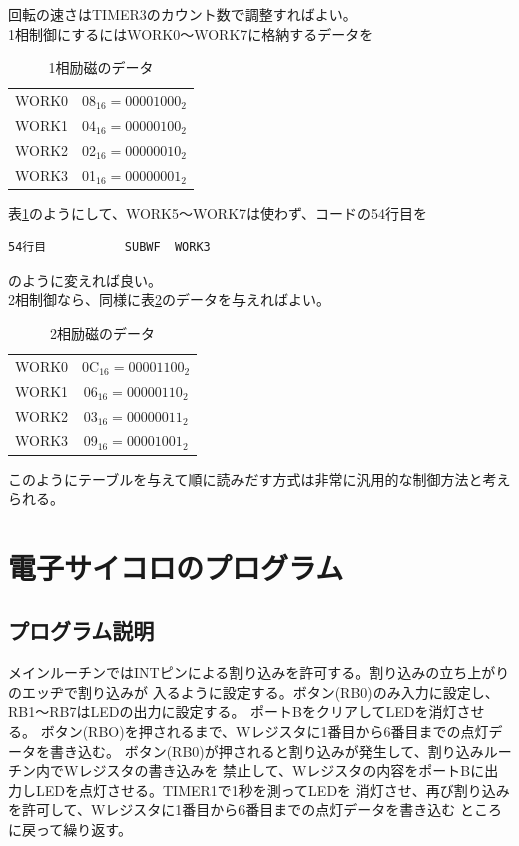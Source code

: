 \documentclass[a4paper,12pt]{ujarticle}
\begin{document}
     回転の速さはTIMER3のカウント数で調整すればよい。
     \\

     1相制御にするにはWORK0〜WORK7に格納するデータを
     \begin{table}[htbp]
      \begin{center}
       \caption{1相励磁のデータ}
       \label{table:1-data}
       \begin{tabular}{|c|c|}
        \hline
        WORK0 & 08$_{16}=00001000_2$\\
        WORK1 & 04$_{16}=00000100_2$\\
        WORK2 & 02$_{16}=00000010_2$\\
        WORK3 & 01$_{16}=00000001_2$\\ \hline
       \end{tabular}
      \end{center}
     \end{table}
     表\ref{table:1-data}のようにして、WORK5〜WORK7は使わず、コードの54行目を
     \begin{lstlisting}[basicstyle=\ttfamily\footnotesize, frame=single]
54行目           SUBWF  WORK3
     \end{lstlisting}
     のように変えれば良い。
     \\

     2相制御なら、同様に表\ref{table:2-data}のデータを与えればよい。
     \begin{table}[htbp]
      \begin{center}
       \caption{2相励磁のデータ}
       \label{table:2-data}
       \begin{tabular}{|c|c|} \hline
        WORK0 & 0C$_{16}=00001100_2$\\
        WORK1 & 06$_{16}=00000110_2$\\
        WORK2 & 03$_{16}=00000011_2$\\
        WORK3 & 09$_{16}=00001001_2$\\ \hline
       \end{tabular}
      \end{center}
     \end{table}

     このようにテーブルを与えて順に読みだす方式は非常に汎用的な制御方法と考えられる。
     \clearpage
\section{電子サイコロのプログラム}
  \subsection{プログラム説明}
  メインルーチンではINTピンによる割り込みを許可する。割り込みの立ち上がりのエッヂで割り込みが
  入るように設定する。ボタン(RB0)のみ入力に設定し、RB1〜RB7はLEDの出力に設定する。
  ポートBをクリアしてLEDを消灯させる。
  ボタン(RBO)を押されるまで、Wレジスタに1番目から6番目までの点灯データを書き込む。
  ボタン(RB0)が押されると割り込みが発生して、割り込みルーチン内でWレジスタの書き込みを
  禁止して、Wレジスタの内容をポートBに出力しLEDを点灯させる。TIMER1で1秒を測ってLEDを
  消灯させ、再び割り込みを許可して、Wレジスタに1番目から6番目までの点灯データを書き込む
  ところに戻って繰り返す。
\end{document}
